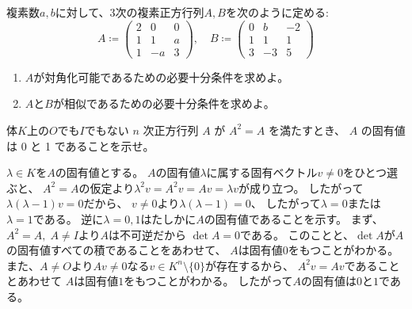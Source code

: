 \documentclass[report]{jlreq}
\begin{document}
\begin{answer}
    \TODO{}
\end{answer}

\begin{problem}[東大数理 2011A]
    複素数$a, b$に対して、3次の複素正方行列$A, B$を次のように定める:
    \begin{equation}
        A \coloneqq \begin{pmatrix}
            2 & 0 & 0 \\
            1 & 1 & a \\
            1 & -a & 3
        \end{pmatrix},
        \quad
        B \coloneqq \begin{pmatrix}
            0 & b & -2 \\
            1 & 1 & 1 \\
            3 & -3 & 5
        \end{pmatrix}
    \end{equation}
    \begin{enumerate}
        \item $A$が対角化可能であるための必要十分条件を求めよ。
        \item $A$と$B$が相似であるための必要十分条件を求めよ。
    \end{enumerate}
\end{problem}

\begin{answer}
    \TODO{}
\end{answer}

\begin{problem}[ChatGPT]
    体$K$上の$O$でも$I$でもない
    $n$ 次正方行列 $A$ が $A^2 = A$ を満たすとき、
    $A$ の固有値は 0 と 1 であることを示せ。
\end{problem}

\begin{answer}
    $\lambda \in K$を$A$の固有値とする。
    $A$の固有値$\lambda$に属する固有ベクトル$v \neq 0$をひとつ選ぶと、
    $A^2 = A$の仮定より$\lambda^2 v = A^2 v = Av = \lambda v$が成り立つ。
    したがって$\lambda (\lambda - 1) v = 0$だから、
    $v \neq 0$より$\lambda (\lambda - 1) = 0$、
    したがって$\lambda = 0$または$\lambda = 1$である。
    逆に$\lambda = 0, 1$はたしかに$A$の固有値であることを示す。
    まず、$A^2 = A, \; A \neq I$より$A$は不可逆だから
    $\det A = 0$である。
    このことと、$\det A$が$A$の固有値すべての積であることをあわせて、
    $A$は固有値$0$をもつことがわかる。
    また、$A \neq O$より$Av \neq 0$なる$v \in K^n \setminus \{ 0 \}$が存在するから、
    $A^2 v = Av$であることとあわせて
    $A$は固有値$1$をもつことがわかる。
    したがって$A$の固有値は$0$と$1$である。
\end{answer}
\end{document}
